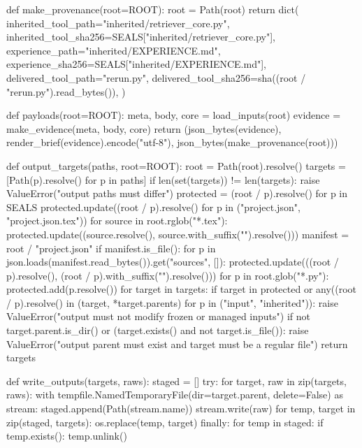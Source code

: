 def make_provenance(root=ROOT):
    root = Path(root)
    return dict(
        inherited_tool_path="inherited/retriever_core.py",
        inherited_tool_sha256=SEALS["inherited/retriever_core.py"],
        experience_path="inherited/EXPERIENCE.md",
        experience_sha256=SEALS["inherited/EXPERIENCE.md"],
        delivered_tool_path="rerun.py",
        delivered_tool_sha256=sha((root / "rerun.py").read_bytes()),
    )

def payloads(root=ROOT):
    meta, body, core = load_inputs(root)
    evidence = make_evidence(meta, body, core)
    return (json_bytes(evidence), render_brief(evidence).encode("utf-8"),
            json_bytes(make_provenance(root)))

def output_targets(paths, root=ROOT):
    root = Path(root).resolve()
    targets = [Path(p).resolve() for p in paths]
    if len(set(targets)) != len(targets):
        raise ValueError("output paths must differ")
    protected = {(root / p).resolve() for p in SEALS}
    protected.update((root / p).resolve() for p in ("project.json", "project.json.tex"))
    for source in root.rglob("*.tex"):
        protected.update((source.resolve(), source.with_suffix("").resolve()))
    manifest = root / "project.json"
    if manifest.is_file():
        for p in json.loads(manifest.read_bytes()).get("sources", []):
            protected.update(((root / p).resolve(), (root / p).with_suffix("").resolve()))
    for p in root.glob("*.py"):
        protected.add(p.resolve())
    for target in targets:
        if target in protected or any((root / p).resolve() in (target, *target.parents)
                                      for p in ("input", "inherited")):
            raise ValueError("output must not modify frozen or managed inputs")
        if not target.parent.is_dir() or (target.exists() and not target.is_file()):
            raise ValueError("output parent must exist and target must be a regular file")
    return targets

def write_outputs(targets, raws):
    staged = []
    try:
        for target, raw in zip(targets, raws):
            with tempfile.NamedTemporaryFile(dir=target.parent, delete=False) as stream:
                staged.append(Path(stream.name))
                stream.write(raw)
        for temp, target in zip(staged, targets):
            os.replace(temp, target)
    finally:
        for temp in staged:
            if temp.exists():
                temp.unlink()

